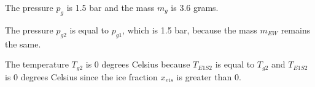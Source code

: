 The pressure \( p_g \) is 1.5 bar and the mass \( m_g \) is 3.6 grams.

The pressure \( p_{g2} \) is equal to \( p_{g1} \), which is 1.5 bar, because the mass \( m_{EW} \) remains the same.

The temperature \( T_{g2} \) is 0 degrees Celsius because \( T_{E1S2} \) is equal to \( T_{g2} \) and \( T_{E1S2} \) is 0 degrees Celsius since the ice fraction \( x_{eis} \) is greater than 0.
